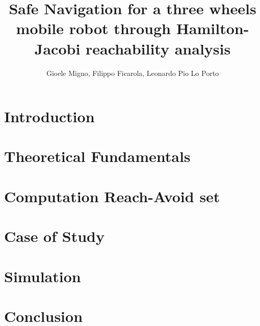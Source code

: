 \documentclass[conference]{IEEEtran}
\begin{document}
    
    \title{Safe Navigation for a three wheels mobile robot through Hamilton-Jacobi reachability analysis}
    \author{Gioele Migno, Filippo Ficarola, Leonardo Pio Lo Porto}
    \maketitle
    
    
    
    \section{Introduction}
        \label{introduction}
        
    
    \section{Theoretical Fundamentals}
        \label{theoretical_fundamentals}
        
    
    \section{Computation Reach-Avoid set}
        \label{comp_ras}
        

    \section{Case of Study}
        \label{case_of_study}
        

    \section{Simulation}
        \label{simulation}
        
        
    \section{Conclusion}
        

    \clearpage
    \appendix
        

    \newpage
    
\end{document}
